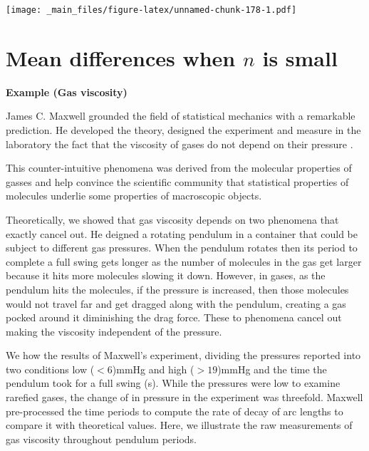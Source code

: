 \documentclass[
]{book}
\begin{document}
\texttt{[image: \_main\_files/figure-latex/unnamed-chunk-178-1.pdf]}

\hypertarget{mean-differences-when-n-is-small}{%
\section{\texorpdfstring{Mean differences when \(n\) is small}{Mean differences when n is small}}\label{mean-differences-when-n-is-small}}

\textbf{Example (Gas viscosity)}

James C. Maxwell grounded the field of statistical mechanics with a remarkable prediction. He developed the theory, designed the experiment and measure in the laboratory the fact that the viscosity of gases do not depend on their pressure \citep{maxwell1866viscosity}.

This counter-intuitive phenomena was derived from the molecular properties of gasses and help convince the scientific community that statistical properties of molecules underlie some properties of macroscopic objects.

Theoretically, we showed that gas viscosity depends on two phenomena that exactly cancel out. He deigned a rotating pendulum in a container that could be subject to different gas pressures. When the pendulum rotates then its period to complete a full swing gets longer as the number of molecules in the gas get larger because it hits more molecules slowing it down. However, in gases, as the pendulum hits the molecules, if the pressure is increased, then those molecules would not travel far and get dragged along with the pendulum, creating a gas pocked around it diminishing the drag force. These to phenomena cancel out making the viscosity independent of the pressure.

We how the results of Maxwell's experiment, dividing the pressures reported into two conditions low (\(<6\))mmHg and high (\(>19\))mmHg and the time the pendulum took for a full swing (s). While the pressures were low to examine rarefied gases, the change of in pressure in the experiment was threefold. Maxwell pre-processed the time periods to compute the rate of decay of arc lengths to compare it with theoretical values. Here, we illustrate the raw measurements of gas viscosity throughout pendulum periods.
\end{document}
